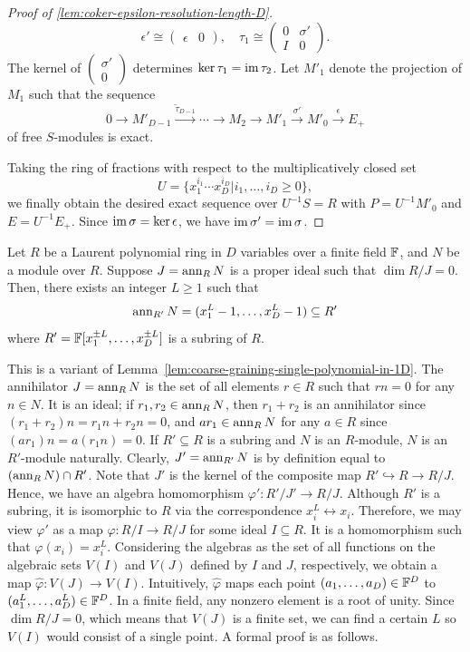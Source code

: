 \begin{proof}[Proof of \ref{lem:coker-epsilon-resolution-length-D}]
\[
\epsilon' \cong
\begin{pmatrix}
 \epsilon & 0
\end{pmatrix} ,
\quad
 \tau_1 \cong
\begin{pmatrix}
 0 & \sigma' \\
 I & 0
\end{pmatrix} .
\]
The kernel of $\begin{pmatrix} \sigma' \\ 0 \end{pmatrix}$ determines $\ker \tau_1 = \mathop{\mathrm{im}}\nolimits \tau_2$.
Let $M'_1$ denote the projection of $M_1$ such that the sequence
\[
 0 \to M'_{D-1} \xrightarrow{\tilde \tau_{D-1}}
 \cdots \to M_2 \to M'_1 \xrightarrow{\sigma'} M'_0 \xrightarrow{\epsilon} E_+ 
\]
of free $S$-modules is exact.

Taking the ring of fractions with respect to the multiplicatively closed set 
\[
U = \{x_1^{i_1} \cdots x_D^{i_D} | i_1,\ldots,i_D \ge 0\},
\]
we finally obtain the desired exact sequence over $U^{-1}S = R$ 
with $P = U^{-1}M'_0$ and $E = U^{-1}E_+$.
Since $\mathop{\mathrm{im}}\nolimits \sigma = \ker \epsilon$, we have $\mathop{\mathrm{im}}\nolimits \sigma' = \mathop{\mathrm{im}}\nolimits \sigma$.
\end{proof}


\begin{lem}
Let $R$ be a Laurent polynomial ring in $D$ variables over a finite field $\mathbb{F}$,
and $N$ be a module over $R$.
Suppose $J = \mathop{\mathrm{ann}}\nolimits_R N$ is a proper ideal such that $\dim R/J = 0$.
Then, there exists an integer $L \ge 1$ such that
\[
 \mathop{\mathrm{ann}}\nolimits_{R'} N = (x_1^L -1, \ldots, x_D^L -1) \subseteq R'
\]
where $R' = \mathbb{F}[x_1^{\pm L},\ldots,x_D^{\pm L}]$ is a subring of $R$.
\label{lem:zero-dim-ideal-over-finite-field}
\end{lem}

This is a variant of Lemma~\ref{lem:coarse-graining-single-polynomial-in-1D}.
The annihilator $J = \mathop{\mathrm{ann}}\nolimits_R N$ is the set of all elements $r \in R$ such that
$r n = 0$ for any $n \in N$.
It is an ideal;
if $r_1, r_2 \in \mathop{\mathrm{ann}}\nolimits_R N$, then
$r_1+r_2$ is an annihilator since $(r_1 + r_2)n = r_1 n + r_2 n = 0$,
and $a r_1 \in \mathop{\mathrm{ann}}\nolimits_R N$ for any $a \in R$ since $(a r_1) n = a(r_1 n)=0$.
If $R' \subseteq R$ is a subring and $N$ is an $R$-module,
$N$ is an $R'$-module naturally.
Clearly, $J' = \mathop{\mathrm{ann}}\nolimits_{R'} N$ is by definition equal to $(\mathop{\mathrm{ann}}\nolimits_{R} N) \cap R'$.
Note that $J'$ is the kernel of the composite map $R' \hookrightarrow R \to R/J$.
Hence, we have an algebra homomorphism $\varphi' : R'/J' \to R/J$.
Although $R'$ is a subring, it is isomorphic to $R$ via the correspondence $x_i^L \leftrightarrow x_i$.
Therefore, we may view $\varphi'$ as a map $\varphi: R/I \to R/J$ for some ideal $I \subseteq R$.
It is a homomorphism such that $\varphi(x_i) = x_i^L$.
Considering the algebras as the set of all functions on the algebraic sets $V(I)$ and $V(J)$ defined by $I$ and $J$, respectively,
we obtain a map $\hat \varphi : V(J) \to V(I)$.
Intuitively, $\hat \varphi$ maps each point $(a_1,\ldots,a_D) \in \mathbb{F}^D$ to $(a_1^L,\ldots,a_D^L) \in \mathbb{F}^D$.
In a finite field, any nonzero element is a root of unity.
Since $\dim R/J = 0$, which means that $V(J)$ is a finite set, we can find a certain $L$
so $V(I)$ would consist of a single point. A formal proof is as follows.

